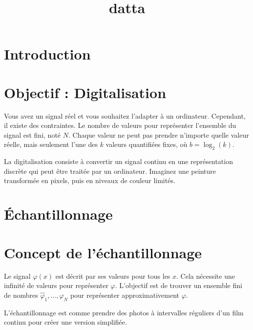 \documentclass[12pt]{article}
\title{datta}
\author{}
\date{}
\begin{document}
\maketitle
\tableofcontents
\newpage

\section{Introduction}

\sub\section{Objectif : Digitalisation}

Vous avez un signal réel et vous souhaitez l'adapter à un ordinateur. Cependant, il existe des contraintes. Le nombre de valeurs pour représenter l'ensemble du signal est fini, noté $N$. Chaque valeur ne peut pas prendre n'importe quelle valeur réelle, mais seulement l'une des $k$ valeurs quantifiées fixes, où $b = \log_2(k)$.

\begin{tcolorbox}[title={Intuition}]
La digitalisation consiste à convertir un signal continu en une représentation discrète qui peut être traitée par un ordinateur. Imaginez une peinture transformée en pixels, puis en niveaux de couleur limités.
\end{tcolorbox}


\newpage

\section{Échantillonnage}

\sub\section{Concept de l'échantillonnage}

Le signal $\varphi(x)$ est décrit par ses valeurs pour tous les $x$. Cela nécessite une infinité de valeurs pour représenter $\varphi$. L'objectif est de trouver un ensemble fini de nombres $\hat{\varphi}_1, \ldots, \hat{\varphi}_N$ pour représenter approximativement $\varphi$.

\begin{tcolorbox}[title={Vulgarisation simple}]
L'échantillonnage est comme prendre des photos à intervalles réguliers d'un film continu pour créer une version simplifiée.
\end{tcolorbox}
\end{document}
